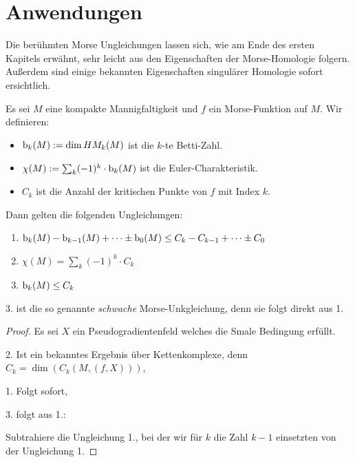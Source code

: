 \section{Anwendungen}

Die berühmten Morse Ungleichungen lassen sich, wie am Ende des ersten Kapitels erwähnt, sehr
leicht aus den Eigenschaften der Morse-Homologie folgern. Außerdem sind einige bekannten 
Eigenschaften singulärer Homologie sofort ersichtlich.

\begin{theorem}
    \label{satz: morse-ungleichungen}
    Es sei $M$ eine kompakte Mannigfaltigkeit und $f$ ein Morse-Funktion auf $M$.
    Wir definieren:
    \begin{itemize}
        \item ${ \operatorname{b} }_k (M) := \dim HM_k (M)$ ist die $k$-te Betti-Zahl.
        \item $\chi(M) := \sum_k (-1)^k \cdot { \operatorname{b} }_k(M)$ ist die Euler-Charakteristik.
        \item $C_k$ ist die Anzahl der kritischen Punkte von $f$ mit Index $k$.
    \end{itemize}
    Dann gelten die folgenden Ungleichungen:
    \begin{enumerate}
        \item ${ \operatorname{b} }_k(M) - { \operatorname{b} }_{k - 1}(M) + \dots \pm { \operatorname{b} }_0(M) \leq
            C_k - C_{k - 1} + \dots \pm C_0$
        \item $\chi (M) = \sum_k (-1)^k \cdot C_k$
        \item ${ \operatorname{b} }_k(M) \leq C_k$
    \end{enumerate}
    3. ist die so genannte \emph{schwache} Morse-Unkgleichung, denn sie folgt direkt aus 1.
\end{theorem}

\begin{proof}
    Es sei $X$ ein Pseudogradientenfeld welches die Smale Bedingung erfüllt.

    2. Ist ein bekanntes Ergebnis über Kettenkomplexe, denn $C_k = \dim(C_k (M, (f, X)))$,

    1. Folgt sofort,

    3. folgt aus 1.:

    Subtrahiere die Ungleichung 1., bei der wir für $k$ die Zahl $k - 1$ einsetzten von der 
    Ungleichung 1.
\end{proof}

\begin{theorem}
    
\end{theorem}
